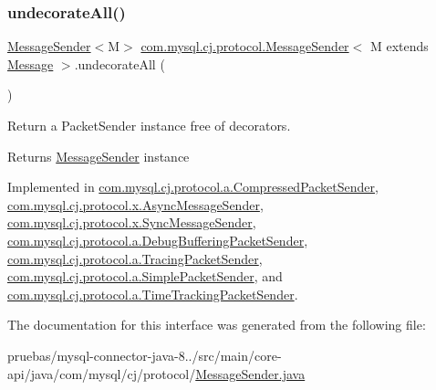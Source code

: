 \subsubsection{\texorpdfstring{undecorate\+All()}{undecorateAll()}}
{\footnotesize\ttfamily \mbox{\hyperlink{interfacecom_1_1mysql_1_1cj_1_1protocol_1_1_message_sender}{Message\+Sender}}$<$M$>$ \mbox{\hyperlink{interfacecom_1_1mysql_1_1cj_1_1protocol_1_1_message_sender}{com.\+mysql.\+cj.\+protocol.\+Message\+Sender}}$<$ M extends \mbox{\hyperlink{interfacecom_1_1mysql_1_1cj_1_1protocol_1_1_message}{Message}} $>$.undecorate\+All (\begin{DoxyParamCaption}{ }\end{DoxyParamCaption})}

Return a Packet\+Sender instance free of decorators.

\begin{DoxyReturn}{Returns}
\mbox{\hyperlink{interfacecom_1_1mysql_1_1cj_1_1protocol_1_1_message_sender}{Message\+Sender}} instance 
\end{DoxyReturn}


Implemented in \mbox{\hyperlink{classcom_1_1mysql_1_1cj_1_1protocol_1_1a_1_1_compressed_packet_sender_a06ec74d67adf77498b1f95148cd59323}{com.\+mysql.\+cj.\+protocol.\+a.\+Compressed\+Packet\+Sender}}, \mbox{\hyperlink{classcom_1_1mysql_1_1cj_1_1protocol_1_1x_1_1_async_message_sender_ad00ea2b9a6d74feb32a301410fc829f0}{com.\+mysql.\+cj.\+protocol.\+x.\+Async\+Message\+Sender}}, \mbox{\hyperlink{classcom_1_1mysql_1_1cj_1_1protocol_1_1x_1_1_sync_message_sender_a7228daf021acf6d8505108645317825d}{com.\+mysql.\+cj.\+protocol.\+x.\+Sync\+Message\+Sender}}, \mbox{\hyperlink{classcom_1_1mysql_1_1cj_1_1protocol_1_1a_1_1_debug_buffering_packet_sender_a00c2c86d5ab855c81addbc039560b66b}{com.\+mysql.\+cj.\+protocol.\+a.\+Debug\+Buffering\+Packet\+Sender}}, \mbox{\hyperlink{classcom_1_1mysql_1_1cj_1_1protocol_1_1a_1_1_tracing_packet_sender_a57670e7bdafb2dd88cb711fb7e60266d}{com.\+mysql.\+cj.\+protocol.\+a.\+Tracing\+Packet\+Sender}}, \mbox{\hyperlink{classcom_1_1mysql_1_1cj_1_1protocol_1_1a_1_1_simple_packet_sender_a2fa36445cf29dff6e32000dc6c95c831}{com.\+mysql.\+cj.\+protocol.\+a.\+Simple\+Packet\+Sender}}, and \mbox{\hyperlink{classcom_1_1mysql_1_1cj_1_1protocol_1_1a_1_1_time_tracking_packet_sender_a26a673b209acd1d181f62dceed280750}{com.\+mysql.\+cj.\+protocol.\+a.\+Time\+Tracking\+Packet\+Sender}}.



The documentation for this interface was generated from the following file\+:\begin{DoxyCompactItemize}
\item 
pruebas/mysql-\/connector-\/java-\/8../src/main/core-\/api/java/com/mysql/cj/protocol/\mbox{\hyperlink{_message_sender_8java}{Message\+Sender.\+java}}\end{DoxyCompactItemize}
